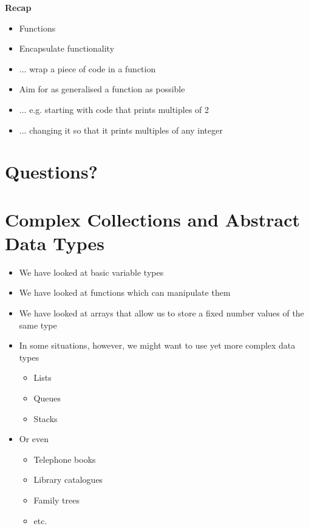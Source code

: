 \documentclass{beamer}
\begin{document}
\begin{frame}[fragile]
\begin{center}
\textbf{Recap}
\end{center}
\begin{itemize}
\item Functions
\bigskip
\item Encapsulate functionality
\item ... wrap a piece of code in a function
\item Aim for as generalised a function as possible
\item ... e.g. starting with code that prints multiples of 2
\item ... changing it so that it prints multiples of any integer 
\end{itemize}
\end{frame}

\section{Questions?}

\section{Complex Collections and Abstract Data Types}
\begin{frame}
\begin{itemize}
\item We have looked at basic variable types
\item We have looked at functions which can manipulate them
\item We have looked at arrays that allow us to store a fixed number values of the same type
\end{itemize}
\end{frame}

\begin{frame}
\begin{itemize}
\item In some situations, however, we might want to use yet more complex data types
\begin{itemize}
\item Lists
\item Queues
\item Stacks
\end{itemize}
\bigskip
\item Or even
\begin{itemize}
\item Telephone books
\item Library catalogues
\item Family trees
\item etc.
\end{itemize}
\end{itemize}
\end{frame}
\end{document}
